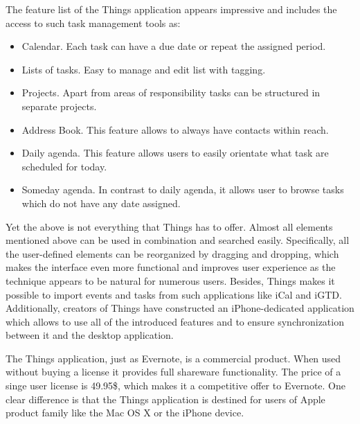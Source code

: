 The feature list of the Things application appears impressive and includes the access to such task management tools as:
 \begin{itemize}
 \item{Calendar. Each task can have a due date or repeat the assigned period.}
 \item{Lists of tasks. Easy to manage and edit list with tagging.}
 \item{Projects. Apart from areas of responsibility tasks can be structured in separate projects.}
 \item{Address Book. This feature allows to always have contacts within reach.}
 \item{Daily agenda. This feature allows users to easily orientate what task are scheduled for today.}
 \item{Someday agenda. In contrast to daily agenda, it allows user to browse tasks which do not have any date assigned.}
 \end{itemize}
Yet the above is not everything that Things has to offer. Almost all elements mentioned above can be used in combination and searched easily. Specifically, all the user-defined elements can be reorganized by dragging and dropping, which makes the interface even more functional and improves user experience as the technique appears to be natural for numerous users. Besides, Things makes it possible to import events and tasks from such applications like iCal and iGTD. Additionally, creators of Things have constructed an iPhone-dedicated application which allows to use all of the introduced features and to ensure synchronization between it and the desktop application. 

The Things application, just as Evernote, is a commercial product. When used without buying a license it provides full shareware functionality. The price of a singe user license is 49.95\$, which makes it a competitive offer to Evernote. One clear difference is that the Things application is destined for users of Apple product family like the Mac OS X or the iPhone device.
 

